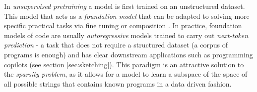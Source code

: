 In \emph{unsupervised pretraining} a model is first trained on an unstructured dataset.
This model that acts as a \emph{foundation model} \cite{yangFoundationModelsDecision2023, yuanPowerFoundationModels2023, zhouComprehensiveSurveyPretrained2023} that can be adapted to solving more specific practical tasks via fine tuning \cite{panTransferLearning2020, weissSurveyTransferLearning2016a, zhuangComprehensiveSurveyTransfer2020} or composition \cite{shivakumarStudyImpactLanguage2017}.
In practice, foundation models of code are usually \emph{autoregressive} models trained to carry out \emph{next-token prediction} \cite{shlegerisLanguageModelsAre2024} - a task that does not require a structured dataset (a corpus of programs is enough) and has clear downstream applications such as programming copilots (see section \ref{sec:sketching}).
This paradigm is an attractive solution to the \emph{sparsity problem}, as it allows for a model to learn a subspace of the space of all possible strings that contains known programs in a data driven fashion.

